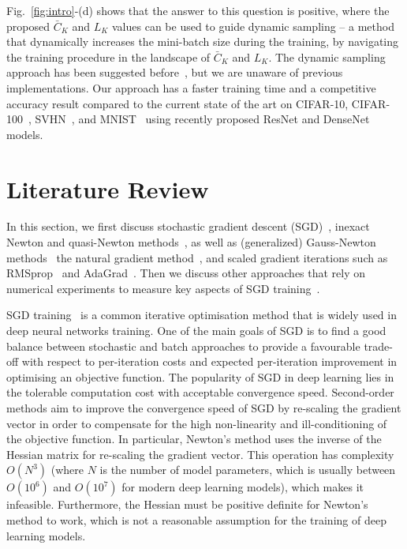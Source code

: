 \documentclass[10pt,journal,compsoc]{IEEEtran}
\begin{document}
Fig.~\ref{fig:intro}-(d) shows that the answer to this question is positive, where the proposed $\bar{C}_K$ and $L_K$ values can be used to guide dynamic sampling -- a method that dynamically increases the mini-batch size during the training, by navigating the training procedure in the landscape of $\bar{C}_K$ and $L_K$.  The dynamic sampling approach has been suggested before~\cite{keskar2016large,bottou2016optimization}, but we are unaware of previous implementations.  
Our approach has a faster training time and a competitive accuracy result compared to the current state of the art on CIFAR-10, CIFAR-100~\cite{krizhevsky2009learning}, SVHN~\cite{netzer2011reading}, and MNIST~\cite{lecun1998gradient} using recently proposed ResNet and DenseNet models. 



\section{Literature Review}

In this section, we first discuss stochastic gradient descent (SGD)~\cite{robbins1951stochastic}, inexact Newton and quasi-Newton methods~\cite{fletcher2013practical, bottou2016optimization,byrd1995limited}, as well as (generalized) Gauss-Newton methods~\cite{bertsekas1996incremental,schraudolph2001fast}
the natural gradient method~\cite{amari1998natural}, and scaled gradient iterations such as RMSprop~\cite{tieleman2012lecture} and AdaGrad~\cite{duchi2011adaptive}.  Then we discuss other approaches that rely on numerical experiments to measure key aspects of SGD training~\cite{keskar2016large,littwin2016loss,soudry2016no,lee2016gradient,sagun2016singularity}. 


SGD training~\cite{robbins1951stochastic} is a common iterative optimisation method that is widely used in deep neural networks training.  One of the main goals of SGD is to find a good balance between stochastic and batch approaches to provide a favourable trade-off with respect to per-iteration costs and expected per-iteration improvement in optimising an objective function.  The popularity of SGD in deep learning lies in the tolerable computation cost with acceptable convergence speed.
Second-order methods aim to improve the convergence speed of SGD by re-scaling the gradient vector in order to compensate for the high non-linearity and ill-conditioning of the objective function.  In particular, Newton's method uses the inverse of the Hessian matrix for re-scaling the gradient vector.  This operation has complexity $O(N^3)$ (where $N$ is the number of model parameters, which is usually between $O(10^6)$ and $O(10^7)$ for modern deep learning models), which makes it infeasible.  Furthermore, the Hessian must be positive definite for Newton's method to work, which is not a reasonable assumption for the training of deep learning models.
\end{document}
